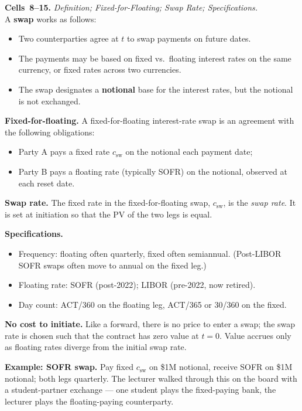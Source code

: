\begin{keyblock}
\textbf{Cells~8--15.} \emph{Definition; Fixed-for-Floating; Swap Rate; Specifications.}\\
A \textbf{swap} works as follows:
\begin{itemize}
  \item Two counterparties agree at $t$ to swap payments on future dates.
  \item The payments may be based on fixed vs.~floating interest rates on
        the same currency, or fixed rates across two currencies.
  \item The swap designates a \textbf{notional} base for the interest
        rates, but the notional is not exchanged.
\end{itemize}

\textbf{Fixed-for-floating.} A fixed-for-floating interest-rate swap is an
agreement with the following obligations:
\begin{itemize}
  \item Party A pays a fixed rate $c_{\text{sw}}$ on the notional each
        payment date;
  \item Party B pays a floating rate (typically SOFR) on the notional,
        observed at each reset date.
\end{itemize}

\textbf{Swap rate.} The fixed rate in the fixed-for-floating swap,
$c_{\text{sw}}$, is the \emph{swap rate}. It is set at initiation so that
the PV of the two legs is equal.

\textbf{Specifications.}
\begin{itemize}
  \item Frequency: floating often quarterly, fixed often semiannual.
    (Post-LIBOR SOFR swaps often move to annual on the fixed leg.)
  \item Floating rate: SOFR (post-2022); LIBOR (pre-2022, now retired).
  \item Day count: ACT/360 on the floating leg, ACT/365 or 30/360 on the fixed.
\end{itemize}

\textbf{No cost to initiate.} Like a forward, there is no price to enter a
swap; the swap rate is chosen such that the contract has zero value at
$t=0$. Value accrues only as floating rates diverge from the initial swap
rate.

\textbf{Example: SOFR swap.} Pay fixed $c_{\text{sw}}$ on \$1M notional,
receive SOFR on \$1M notional; both legs quarterly. The lecturer walked
through this on the board with a student-partner exchange --- one student
plays the fixed-paying bank, the lecturer plays the floating-paying
counterparty.
\end{keyblock}

